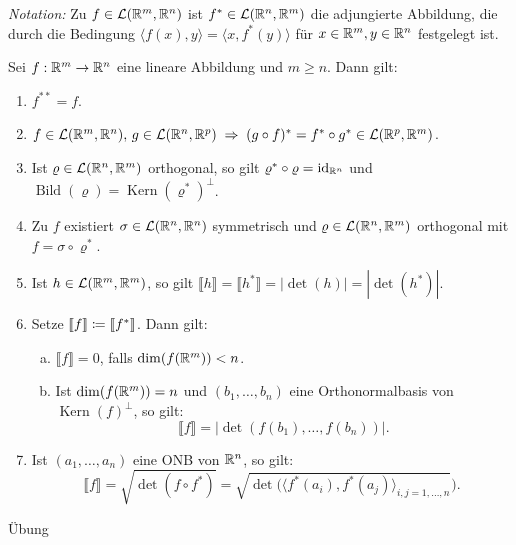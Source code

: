 \documentclass[a4paper,twoside,DIV15,BCOR12mm]{scrbook}
\DeclareMathOperator{\id}{id}
\DeclareMathOperator{\Kern}{Kern}
\DeclareMathOperator{\Bild}{Bild}
\begin{document}
\emph{Notation:} Zu \(f \in \mathcal{L}(\mathbb{R}^m,\mathbb{R}^n)\) ist \(f^* \in \mathcal{L}(\mathbb{R}^n,\mathbb{R}^m)\) die adjungierte Abbildung, die 
durch die Bedingung \(\langle f(x),y\rangle = \langle x,f^*(y)\rangle\) für \(x\in\mathbb{R}^m, y\in\mathbb{R}^n\) 
festgelegt ist.

\begin{lemma}\label{lem:3.12}
Sei \(f:\mathbb{R}^m\to\mathbb{R}^n\) eine lineare Abbildung und \(m\geq n\). Dann gilt:
\begin{enumerate}[(1)]
\item \(f^{**} = f\).
\item \(f\in\mathcal{L}(\mathbb{R}^m,\mathbb{R}^n),\, g\in\mathcal{L}(\mathbb{R}^n,\mathbb{R}^p) \; \Rightarrow \; (g\circ f)^* = f^* \circ g^* \in \mathcal{L}(\mathbb{R}^p,\mathbb{R}^m)\).
\item Ist \(\varrho \in \mathcal{L}(\mathbb{R}^n,\mathbb{R}^m)\) orthogonal, so gilt \(\varrho^* \circ \varrho = \id_{\MdR^n}\) und \(\Bild(\varrho) = \Kern(\varrho^*)^\perp\).
\item Zu \(f\) existiert \(\sigma \in \mathcal{L}(\mathbb{R}^n,\mathbb{R}^n)\) symmetrisch und \(\varrho\in \mathcal{L}(\mathbb{R}^n,\mathbb{R}^m)\) orthogonal mit \(f = \sigma \circ \varrho^*\).
\item Ist \(h \in \mathcal{L}(\mathbb{R}^m,\mathbb{R}^m)\), so gilt \(\llbracket h \rrbracket = \llbracket h^* \rrbracket = |\det(h)| = |\det(h^*)|\).
\item Setze \(\llbracket f \rrbracket \da \llbracket f^* \rrbracket\). Dann gilt:
	\begin{enumerate}[(a)]
	\item \(\llbracket f \rrbracket = 0\), falls \(\dim(f(\mathbb{R}^m)) < n\).
	\item Ist \(\dim(f(\mathbb{R}^m)) = n\) und \((b_1,\dots,b_n)\) eine Orthonormalbasis von \(\Kern(f)^\perp\), so gilt:
\[
\llbracket f \rrbracket = |\det(f(b_1),\dots,f(b_n))|.
\]
	\end{enumerate}
\item Ist \((a_1,\dots,a_n)\) eine ONB von \(\mathbb{R}^n\), so gilt:
\[
\llbracket f \rrbracket = \sqrt{\det(f\circ f^*)} = \sqrt{
\det(\langle f^*(a_i),f^*(a_j)\rangle_{i,j=1,\dots,n}}).
\]
\end{enumerate}
\end{lemma}
\begin{beweis}
Übung
\end{beweis}
\end{document}
